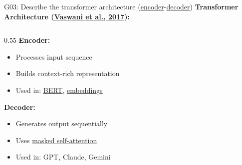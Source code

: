 \documentclass[aspectratio=169, 10pt]{beamer}
\begin{document}
\begin{frame}{G03: Describe the transformer architecture (\href{https://en.wikipedia.org/wiki/Transformer_(deep_learning_architecture)\#Encoder}{encoder}-\href{https://en.wikipedia.org/wiki/Transformer_(deep_learning_architecture)\#Decoder}{decoder})}
    \textbf{Transformer Architecture (\href{https://arxiv.org/abs/1706.03762}{Vaswani et al., 2017}):}

    \begin{columns}[T]
        \begin{column}{0.55\textwidth}
            \textbf{Encoder:}
            \begin{itemize}
                \item Processes input sequence
                \item Builds context-rich representation
                \item Used in: \href{https://arxiv.org/abs/1810.04805}{BERT}, \href{https://en.wikipedia.org/wiki/Word_embedding}{embeddings}
            \end{itemize}

            \vspace{0.2cm}
            \textbf{Decoder:}
            \begin{itemize}
                \item Generates output sequentially
                \item Uses \href{https://en.wikipedia.org/wiki/Attention_(machine_learning)\#Causal_attention}{masked self-attention}
                \item Used in: GPT, Claude, Gemini
            \end{itemize}


\end{column}
\end{columns}
\end{frame}
\end{document}
